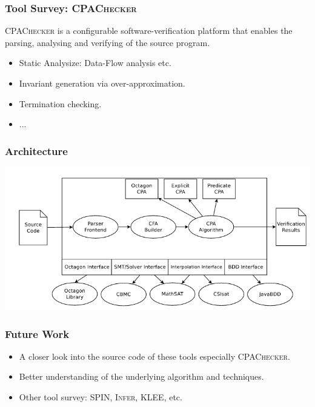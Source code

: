 \documentclass[11pt]{beamer}
\begin{document}
\begin{frame}\frametitle{Tool Survey: \textsc{CPAChecker}}
\textsc{CPAChecker} is a configurable software-verification platform that enables the parsing, analysing and verifying of the source program.

\begin{itemize}
\item Static Analysize: Data-Flow analysis etc.
\item Invariant generation via over-approximation.
\item Termination checking.
\item ...
\end{itemize}

\end{frame}
\begin{frame}\frametitle{Architecture}


\begin{center}
\includegraphics[scale=0.4]{cpa_arch.png}
\end{center}
\end{frame}


\begin{frame}\frametitle{Future Work}
\begin{itemize}
\item A closer look into the source code of these tools especially \textsc{CPAChecker}.

\item Better understanding of the underlying algorithm and techniques.

\item Other tool survey: \textsc{SPIN}, \textsc{Infer}, \textsc{KLEE}, etc.
\end{itemize}
\end{frame}
\end{document}
